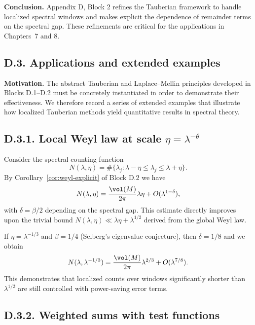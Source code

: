 \bigskip
\noindent \textbf{Conclusion.} Appendix D, Block 2 refines the Tauberian framework to handle localized spectral windows and makes explicit the dependence of remainder terms on the spectral gap. These refinements are critical for the applications in Chapters~7 and 8.

\subsection*{D.3. Applications and extended examples}

\noindent \textbf{Motivation.}  
The abstract Tauberian and Laplace–Mellin principles developed in Blocks D.1–D.2 must be concretely instantiated in order to demonstrate their effectiveness.  
We therefore record a series of extended examples that illustrate how localized Tauberian methods yield quantitative results in spectral theory.

\medskip

\subsection*{D.3.1. Local Weyl law at scale $\eta=\lambda^{-\theta}$}

\noindent Consider the spectral counting function
\[
N(\lambda,\eta) = \#\{\lambda_j: \lambda-\eta \le \lambda_j \le \lambda+\eta\}.
\]
By Corollary~\ref{cor:weyl-explicit} of Block D.2 we have
\[
N(\lambda,\eta) = \frac{\vol(M)}{2\pi}\lambda\eta + O(\lambda^{1-\delta}),
\]
with $\delta=\beta/2$ depending on the spectral gap.  
This estimate directly improves upon the trivial bound $N(\lambda,\eta)\ll \lambda \eta + \lambda^{1/2}$ derived from the global Weyl law.

\medskip

\begin{example}
If $\eta=\lambda^{-1/3}$ and $\beta=1/4$ (Selberg’s eigenvalue conjecture), then $\delta=1/8$ and we obtain
\[
N(\lambda,\lambda^{-1/3}) = \frac{\vol(M)}{2\pi}\lambda^{2/3} + O(\lambda^{7/8}).
\]
This demonstrates that localized counts over windows significantly shorter than $\lambda^{1/2}$ are still controlled with power-saving error terms.  
\end{example}

\medskip

\subsection*{D.3.2. Weighted sums with test functions}

